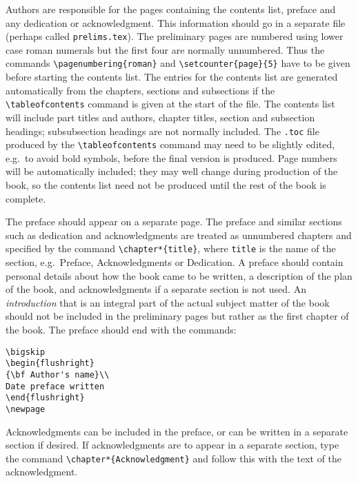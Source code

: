 Authors are responsible for the 
pages containing the contents list, 
preface and any dedication or 
acknowledgment. This 
information should go in a separate file (perhaps called 
\verb"prelims.tex").  
The preliminary pages are numbered using lower case roman numerals
but the first four are normally unnumbered.
Thus the commands \verb"\pagenumbering{roman}"
and \verb"\setcounter{page}{5}" have to be given before
starting the contents list.
The entries for the 
contents list are generated automatically from the chapters, 
sections and subsections
if the \verb"\tableofcontents" 
command is given at the start of the file. 
The contents list will include part titles and authors, 
chapter titles, section 
and subsection headings; subsubsection headings are not 
normally included. The \verb".toc" file produced by the
\verb"\tableofcontents" command may need to be 
slightly edited, e.g.\ to
avoid bold symbols, before the final version is produced.
Page numbers will be automatically included; 
they may well 
change during production of the book, so the contents list
need not be produced until the rest of the book is complete.

The preface should appear on a separate page. 
The preface and similar sections such as dedication and acknowledgments
are treated as unnumbered chapters and specified by the command
\verb"\chapter*{title}", 
where \verb"title" is the name of the section, e.g.\ Preface,
Acknowledgments or Dedication. 
A preface should contain personal details about how the book came to be 
written, a description of the plan of the book, and acknowledgments if 
a separate section is not used. 
An {\it introduction\/} that is an 
integral part of the actual subject matter of the book should not be 
included in the preliminary pages but rather as the first chapter of 
the book. The preface should end with the commands:
\begin{verbatim}
\bigskip
\begin{flushright}
{\bf Author's name}\\
Date preface written
\end{flushright}
\newpage
\end{verbatim}

Acknowledgments can be included in the preface, or can be written in a 
separate section if desired. If acknowledgments are to appear in a 
separate section, type the command \verb"\chapter*{Acknowledgment}"
and follow this 
with the text of the acknowledgment. 

